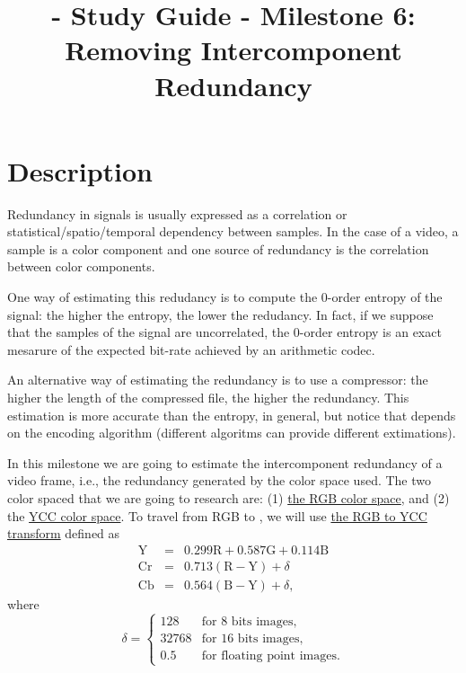 
\title{\SM{} - Study Guide - Milestone 6: Removing Intercomponent Redundancy}

\maketitle

\section{Description}

Redundancy in signals is usually expressed as a correlation or
statistical/spatio/temporal dependency between samples. In the case of
a video, a sample is a color component and one source of redundancy is
the correlation between color components.

One way of estimating this redudancy is to compute the 0-order entropy
of the signal: the higher the entropy, the lower the redudancy. In
fact, if we suppose that the samples of the signal are uncorrelated,
the 0-order entropy is an exact mesarure of the expected bit-rate
achieved by an arithmetic codec.

An alternative way of estimating the redundancy is to use a
compressor: the higher the length of the compressed file, the higher
the redundancy. This estimation is more accurate than the entropy, in
general, but notice that depends on the encoding algorithm (different
algoritms can provide different extimations).

In this milestone we are going to estimate the intercomponent
redundancy of a video frame, i.e., the redundancy generated by the
color space used. The two color spaced that we are going to research
are: (1) \href{https://en.wikipedia.org/wiki/RGB_color_model}{the RGB
  color space}, and (2) the
\href{https://en.wikipedia.org/wiki/YCbCr}{YCC color space}. To travel
from RGB to , we will use
\href{https://docs.opencv.org/3.4/de/d25/imgproc_color_conversions.html}{the
  RGB to YCC transform} defined as
\begin{equation}
  \begin{array}{lcl}
    \text{Y}  & = & 0.299\text{R} + 0.587\text{G} + 0.114\text{B} \\
    \text{Cr} & = & 0.713(\text{R} - \text{Y}) + \delta  \\
    \text{Cb} & = & 0.564(\text{B} - \text{Y}) + \delta,
  \end{array}
\end{equation}
where
\begin{equation}
  \delta = \left\{
  \begin{array}{ll}
    128 & \text{for 8 bits images},\\
    32768 & \text{for 16 bits images},\\
    0.5 & \text{for floating point images}.
  \end{array}
  \right.
\end{equation}

